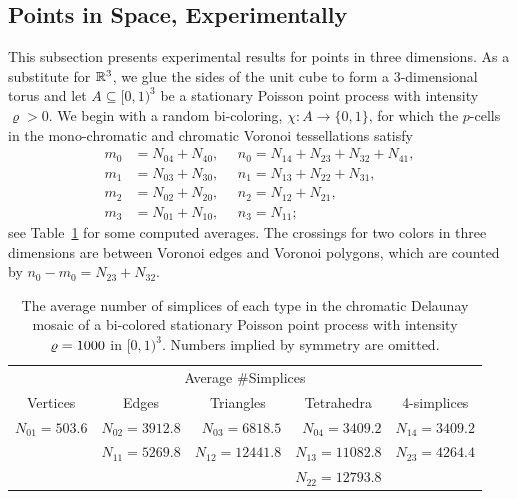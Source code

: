 \documentclass[a4paper]{article}
\newcommand {\mm}[1]   {\ifmmode{#1}\else{\mbox{\(#1\)}}\fi}
\newcommand{\Rspace}        {\mm{{\mathbb R}}}
\newcommand{\intensity}     {\mm{\varrho}}
\theoremstyle{definition}
\numberwithin{theorem}{section}
\numberwithin{equation}{section}
\begin{document}
\subsection{Points in Space, Experimentally}
\label{sec:5.3}

This subsection presents experimental results for points in three dimensions.
As a substitute for $\Rspace^3$, we glue the sides of the unit cube to form a $3$-dimensional torus and let $A \subseteq [0,1)^3$ be a stationary Poisson point process with intensity $\varrho > 0$.
We begin with a random bi-coloring, $\chi \colon A \to \{0,1\}$, for which the $p$-cells in the mono-chromatic and chromatic Voronoi tessellations satisfy
\begin{align}
  m_0  &=  N_{04} + N_{40} ,  ~~~~~~n_0  =  N_{14} + N_{23} + N_{32} + N_{41} , 
    \label{eqn:m0n0d3} \\
  m_1  &=  N_{03} + N_{30} ,  ~~~~~~n_1  =  N_{13} + N_{22} + N_{31} , 
    \label{eqn:m1n1d3} \\
  m_2  &=  N_{02} + N_{20} ,  ~~~~~~n_2  =  N_{12} + N_{21} , 
    \label{eqn:m2n2d3} \\
  m_3  &=  N_{01} + N_{10} ,  ~~~~~~n_3  =  N_{11} ;
    \label{eqn:mpnp_d3_s1}
\end{align}
see Table~\ref{tbl:simplices_d3_s1} for some computed averages.
The crossings for two colors in three dimensions are between Voronoi edges and Voronoi polygons, which are counted by $n_0 - m_0 = N_{23} + N_{32}$.
\begin{table}[hbt]
    \centering
    \begin{tabular}{rrrrr}
      \multicolumn{5}{c}{Average \#Simplices} \\
      \multicolumn{1}{c}{Vertices} & \multicolumn{1}{c}{Edges} & \multicolumn{1}{c}{Triangles} & \multicolumn{1}{c}{Tetrahedra} & \multicolumn{1}{c}{4-simplices} \\
      \hline
      $N_{01} = 503.6$ & $N_{02} = 3912.8$ & $N_{03} =  6818.5$ & $N_{04} =  3409.2$ & $N_{14} = 3409.2$ \\
                        & $N_{11} = 5269.8$ & $N_{12} = 12441.8$ & $N_{13} = 11082.8$ & $N_{23} = 4264.4$ \\
                        &                    &                     & $N_{22} = 12793.8$ &
    \end{tabular}
    \caption{The average number of simplices of each type in the chromatic Delaunay mosaic of a bi-colored stationary Poisson point process with intensity $\intensity = 1000$ in $[0,1)^3$.
    Numbers implied by symmetry are omitted.}
    \label{tbl:simplices_d3_s1}
\end{table}
\end{document}
